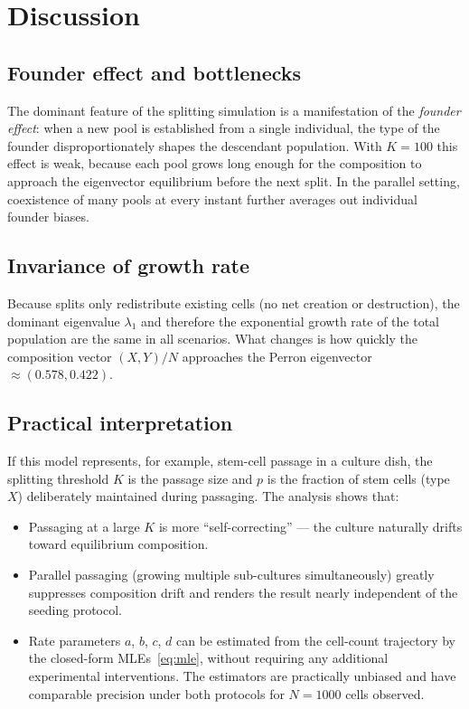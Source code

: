 \documentclass[12pt]{article}
\begin{document}
\section{Discussion}
\label{sec:discussion}

\subsection{Founder effect and bottlenecks}

The dominant feature of the splitting simulation is a manifestation of the
\emph{founder effect}: when a new pool is established from a single individual,
the type of the founder disproportionately shapes the descendant population.
With $K = 100$ this effect is weak, because each pool grows long enough for
the composition to approach the eigenvector equilibrium before the next split.
In the parallel setting, coexistence of many pools at every instant further
averages out individual founder biases.

\subsection{Invariance of growth rate}

Because splits only redistribute existing cells (no net creation or
destruction), the dominant eigenvalue $\lambda_1$ and therefore the
exponential growth rate of the total population are the same in all
scenarios.  What changes is how quickly the composition vector $(X, Y)/N$
approaches the Perron eigenvector $\approx (0.578, 0.422)$.

\subsection{Practical interpretation}

If this model represents, for example, stem-cell passage in a culture dish,
the splitting threshold $K$ is the passage size and $p$ is the fraction of
stem cells (type $X$) deliberately maintained during passaging.  The analysis
shows that:
\begin{itemize}
  \item Passaging at a large $K$ is more ``self-correcting'' — the culture
        naturally drifts toward equilibrium composition.
  \item Parallel passaging (growing multiple sub-cultures simultaneously)
        greatly suppresses composition drift and renders the result nearly
        independent of the seeding protocol.
  \item Rate parameters $a$, $b$, $c$, $d$ can be estimated from the
        cell-count trajectory by the closed-form MLEs~\eqref{eq:mle},
        without requiring any additional experimental interventions.
        The estimators are practically unbiased and have comparable
        precision under both protocols for $N = 1000$ cells observed.
\end{itemize}
\end{document}
